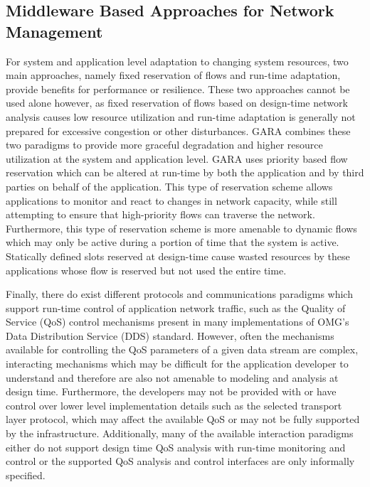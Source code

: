 \subsection{Middleware Based Approaches for Network Management}
\label{subsec:related_part2_middleware}

For system and application level adaptation to changing system
resources, two main approaches, namely fixed reservation of flows and
run-time adaptation, provide benefits for performance or resilience.
These two approaches cannot be used alone however, as fixed
reservation of flows based on design-time network analysis causes low
resource utilization and run-time adaptation is generally not prepared
for excessive congestion or other disturbances.  GARA
\cite{Foster2000} combines these two paradigms to provide more
graceful degradation and higher resource utilization at the system and
application level.  GARA uses priority based flow reservation which
can be altered at run-time by both the application and by third
parties on behalf of the application.  This type of reservation scheme
allows applications to monitor and react to changes in network
capacity, while still attempting to ensure that high-priority flows
can traverse the network.  Furthermore, this type of reservation
scheme is more amenable to dynamic flows which may only be active
during a portion of time that the system is active.  Statically
defined slots reserved at design-time cause wasted resources by these
applications whose flow is reserved but not used the entire time.


Finally, there do exist different protocols and communications
paradigms which support run-time control of application network
traffic, such as the Quality of Service (QoS) control mechanisms
present in many implementations of OMG's Data Distribution Service
(DDS) standard\cite{OMG-DDS:07}\cite{OpenDDS:07}.  However, often the
mechanisms available for controlling the QoS parameters of a given
data stream are complex, interacting mechanisms which may be difficult
for the application developer to understand and therefore are also not
amenable to modeling and analysis at design
time\cite{Hoffert:2010:AED:1862821.1862825}.  Furthermore, the
developers may not be provided with or have control over lower level
implementation details such as the selected transport layer protocol,
which may affect the available QoS or may not be fully supported by
the infrastructure.  Additionally, many of the available interaction
paradigms either do not support design time QoS analysis with run-time
monitoring and control or the supported QoS analysis and control
interfaces are only informally specified.
